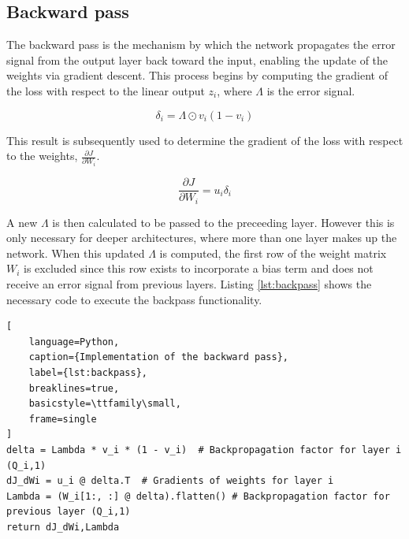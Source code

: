 \documentclass[11pt]{article}
\begin{document}
\subsection*{Backward pass}
The backward pass is the mechanism by which the network propagates the error signal from the output layer back toward the input, enabling the update 
of the weights via gradient descent. This process begins by computing the gradient of the loss with respect to the linear output $z_i$, where $\Lambda$ is 
the error signal. 

\begin{equation}
\delta_i = \Lambda \odot v_i(1 - v_i)
\label{eq:local_gradient}
\end{equation}

This result is subsequently used to determine the gradient of the loss with respect to the weights, $\frac{\partial J}{\partial W_i}$. 

\begin{equation}
\frac{\partial J}{\partial W_i} = u_i \delta_i
\label{eq:weight_gradient}
\end{equation}

A new $\Lambda$ is then calculated to be passed to the preceeding layer. However this is only necessary for deeper architectures, where more than one layer 
makes up the network. When this updated $\Lambda$ is computed, the first row of the weight matrix $W_i$ is excluded since this row exists to incorporate a bias term and 
does not receive an error signal from previous layers. Listing \ref{lst:backpass} shows the necessary code to execute the backpass functionality.

\begin{lstlisting}[
    language=Python, 
    caption={Implementation of the backward pass},
    label={lst:backpass},
    breaklines=true,
    basicstyle=\ttfamily\small,
    frame=single
]
delta = Lambda * v_i * (1 - v_i)  # Backpropagation factor for layer i (Q_i,1)
dJ_dWi = u_i @ delta.T  # Gradients of weights for layer i
Lambda = (W_i[1:, :] @ delta).flatten() # Backpropagation factor for previous layer (Q_i,1) 
return dJ_dWi,Lambda
\end{lstlisting}
\end{document}
